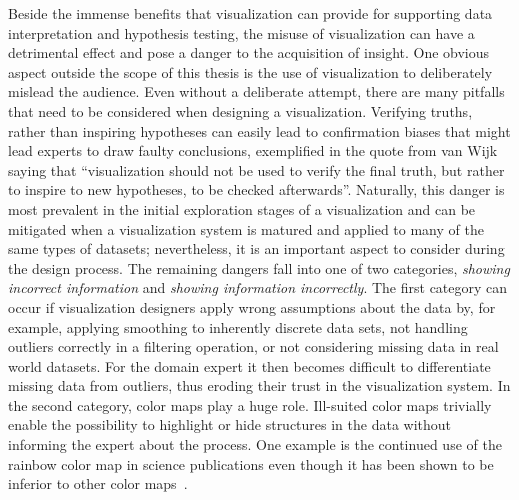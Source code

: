 Beside the immense benefits that visualization can provide for supporting data interpretation and hypothesis testing, the misuse of visualization can have a detrimental effect and pose a danger to the acquisition of insight.  One obvious aspect outside the scope of this thesis is the use of visualization to deliberately mislead the audience.  Even without a deliberate attempt, there are many pitfalls that need to be considered when designing a visualization.  Verifying truths, rather than inspiring hypotheses can easily lead to confirmation biases that might lead experts to draw faulty conclusions, exemplified in the quote from van Wijk saying that ``visualization should not be used to verify the final truth, but rather to inspire to new hypotheses, to be checked afterwards''.  Naturally, this danger is most prevalent in the initial exploration stages of a visualization and can be mitigated when a visualization system is matured and applied to many of the same types of datasets; nevertheless, it is an important aspect to consider during the design process.  The remaining dangers fall into one of two categories, \emph{showing incorrect information} and \emph{showing information incorrectly}.  The first category can occur if visualization designers apply wrong assumptions about the data by, for example, applying smoothing to inherently discrete data sets, not handling outliers correctly in a filtering operation, or not considering missing data in real world datasets.  For the domain expert it then becomes difficult to differentiate missing data from outliers, thus eroding their trust in the visualization system.  In the second category, color maps play a huge role.  Ill-suited color maps trivially enable the possibility to highlight or hide structures in the data without informing the expert about the process.  One example is the continued use of the rainbow color map in science publications even though it has been shown to be inferior to other color maps~\cite{borland2007rainbow}.



